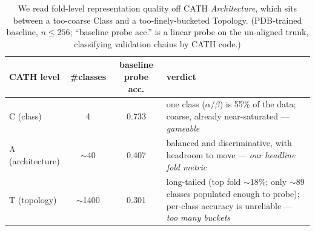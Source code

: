\begin{table}[tbp]
\centering
\small
\begin{tabular}{l c c >{\raggedright\arraybackslash}p{}}
\toprule
\textbf{CATH level} & \textbf{\#classes} & \textbf{baseline probe acc.} & \textbf{verdict} \\
\midrule
C (class)        & 4              & 0.733 & one class ($\alpha/\beta$) is 55\% of the data; coarse, already near-saturated --- \emph{gameable} \\
A (architecture) & $\sim$40       & 0.407 & balanced and discriminative, with headroom to move --- \emph{our headline fold metric} \\
T (topology)     & $\sim$1400     & 0.301 & long-tailed (top fold $\sim$18\%; only $\sim$89 classes populated enough to probe); per-class accuracy is unreliable --- \emph{too many buckets} \\
\bottomrule
\end{tabular}
\caption{We read fold-level representation quality off CATH \emph{Architecture}, which sits between a too-coarse Class and a too-finely-bucketed Topology. (PDB-trained baseline, $n{\le}256$; ``baseline probe acc.'' is a linear probe on the un-aligned trunk, classifying validation chains by CATH code.)}
\label{tab:setup-cath}
\end{table}
